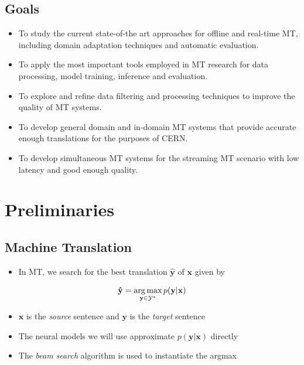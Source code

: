\documentclass[landscape]{article}
\begin{document}
\subsection*{Goals}
\vspace*{5mm}
 \begin{itemize}\itemsep=5mm
 	\item To study the current state-of-the art approaches for offline and real-time MT, including domain adaptation techniques and automatic evaluation.
	\item To apply the most important tools employed in MT research for data processing, model training, inference and evaluation.
	\item To explore and refine data filtering and processing techniques to improve the quality of MT systems.
	\item To develop general domain and in-domain MT systems that provide accurate enough trans\-la\-tions for the purposes of CERN.
	\item To develop simultaneous MT systems for the streaming MT scenario with low latency and good enough quality.
\end{itemize}


\cp
\section{Preliminaries}
\vspace*{10mm}
\subsection*{Machine Translation}
\vspace{5mm}
\begin{itemize}
	\item In MT, we search for the best translation $\mathbf{\hat{y}}$ of $\mathbf{x}$ given by
\end{itemize}
\vspace{5mm}
\begin{equation}\nonumber
	\mathbf{\hat{y}}=\operatorname*{arg\,max}_{\mathbf{y} \in \mathcal{Y^*}} p(\mathbf{y}|\mathbf{x})
\end{equation}
\vspace*{5mm}
\begin{itemize}\itemsep=5mm
	\item $\mathbf{x}$ is the \textit{source} sentence and $\mathbf{y}$ is the \textit{target} sentence
	\item The neural models we will use approximate $p(\mathbf{y}|\mathbf{x})$ directly
	\item The \textit{beam search} algorithm is used to instantiate the argmax
\end{itemize}
\end{document}
